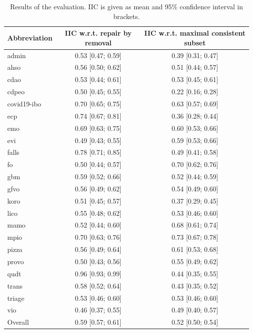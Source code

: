 \begin{table}[ht]
  \scriptsize
  \begin{widepage}
    \centering
    \begin{tabular}{|lcc|}
      \hline
      Abbreviation & IIC w.r.t. repair by removal & IIC w.r.t. maximal consistent subset \\
      \hline
      admin & 0.53 [0.47; 0.59] & 0.39 [0.31; 0.47] \\
      ahso & 0.56 [0.50; 0.62] & 0.51 [0.44; 0.57] \\
      cdao & 0.53 [0.44; 0.61] & 0.53 [0.45; 0.61] \\
      cdpeo & 0.50 [0.45; 0.55] & 0.22 [0.16; 0.28] \\
      covid19-ibo & 0.70 [0.65; 0.75] & 0.63 [0.57; 0.69] \\
      ecp & 0.74 [0.67; 0.81] & 0.36 [0.28; 0.44] \\
      emo & 0.69 [0.63; 0.75] & 0.60 [0.53; 0.66] \\
      evi & 0.49 [0.43; 0.55] & 0.59 [0.53; 0.66] \\
      falls & 0.78 [0.71; 0.85] & 0.49 [0.41; 0.58] \\
      fo & 0.50 [0.44; 0.57] & 0.70 [0.62; 0.76] \\
      gbm & 0.59 [0.52; 0.66] & 0.52 [0.44; 0.59] \\
      gfvo & 0.56 [0.49; 0.62] & 0.54 [0.49; 0.60] \\
      koro & 0.51 [0.45; 0.57] & 0.37 [0.29; 0.45] \\
      lico & 0.55 [0.48; 0.62] & 0.53 [0.46; 0.60] \\
      mamo & 0.52 [0.44; 0.60] & 0.68 [0.61; 0.74] \\
      mpio & 0.70 [0.63; 0.76] & 0.73 [0.67; 0.78] \\
      pizza & 0.56 [0.49; 0.64] & 0.61 [0.53; 0.68] \\
      provo & 0.50 [0.43; 0.56] & 0.55 [0.49; 0.62] \\
      qudt & 0.96 [0.93; 0.99] & 0.44 [0.35; 0.55] \\
      trans & 0.58 [0.52; 0.64] & 0.43 [0.35; 0.52] \\
      triage & 0.53 [0.46; 0.60] & 0.53 [0.46; 0.60] \\
      vio & 0.46 [0.37; 0.55] & 0.49 [0.40; 0.57] \\
      \hline
      Overall & 0.59 [0.57; 0.61] & 0.52 [0.50; 0.54] \\
      \hline
    \end{tabular}
  \end{widepage}
  \caption{Results of the evaluation. IIC is given as mean and 95\% confidence interval in brackets.}
  \label{table:results}
\end{table}


